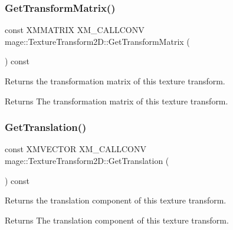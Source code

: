 \subsubsection{\texorpdfstring{Get\+Transform\+Matrix()}{GetTransformMatrix()}}
{\footnotesize\ttfamily const X\+M\+M\+A\+T\+R\+IX X\+M\+\_\+\+C\+A\+L\+L\+C\+O\+NV mage\+::\+Texture\+Transform2\+D\+::\+Get\+Transform\+Matrix (\begin{DoxyParamCaption}{ }\end{DoxyParamCaption}) const\hspace{0.3cm}{\ttfamily [noexcept]}}

Returns the transformation matrix of this texture transform.

\begin{DoxyReturn}{Returns}
The transformation matrix of this texture transform. 
\end{DoxyReturn}
\mbox{\label{classmage_1_1_texture_transform2_d_ac90d3f3d0c91c7126266c944883107cb}} 
\subsubsection{\texorpdfstring{Get\+Translation()}{GetTranslation()}}
{\footnotesize\ttfamily const X\+M\+V\+E\+C\+T\+OR X\+M\+\_\+\+C\+A\+L\+L\+C\+O\+NV mage\+::\+Texture\+Transform2\+D\+::\+Get\+Translation (\begin{DoxyParamCaption}{ }\end{DoxyParamCaption}) const\hspace{0.3cm}{\ttfamily [noexcept]}}

Returns the translation component of this texture transform.

\begin{DoxyReturn}{Returns}
The translation component of this texture transform. 
\end{DoxyReturn}
\mbox{\label{classmage_1_1_texture_transform2_d_a305ff24ae415f870228f9b7cd492db78}} 
